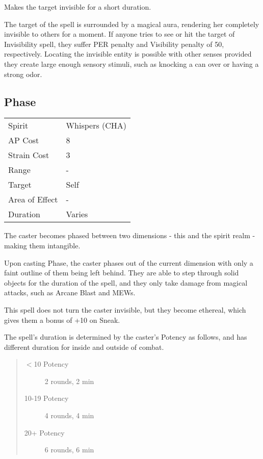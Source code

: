 \documentclass[11pt,a4paper,twocolumn]{book}
\begin{document}
\medskip

Makes the target invisible for a short duration.

The target of the spell is surrounded by a magical aura, rendering her completely invisible to others for a moment. If anyone tries to see or hit the target of Invisibility spell, they suffer PER penalty and Visibility penalty of 50, respectively. Locating the invisible entity is possible with other senses provided they create large enough sensory stimuli, such as knocking a can over or having a strong odor.

\vfill

\subsection*{Phase}
{
	\begin{tabu} to 75mm{| X[l,4] | X[l,7] |}
		\hline
		Spirit         & Whispers (CHA) \\
		AP Cost        & 8                   \\
		Strain Cost    & 3                   \\
		Range          & -         \\
		Target         & Self            \\
		Area of Effect & -                   \\
		Duration       & Varies              \\ \hline
	\end{tabu}
	
}

\medskip

The caster becomes phased between two dimensions - this and the spirit realm - making them intangible.

Upon casting Phase, the caster phases out of the current dimension with only a faint outline of them being left behind. They are able to step through solid objects for the duration of the spell, and they only take damage from magical attacks, such as Arcane Blast and MEWs.

This spell does not turn the caster invisible, but they become ethereal, which gives them a bonus of +10 on Sneak.

The spell's duration is determined by the caster's Potency as follows, and has different duration for inside and outside of combat.

\begin{quote}
	\begin{description}
		\item[$<$10 Potency] 	2 rounds, 2 min
		\item[10-19 Potency] 	4 rounds, 4 min
		\item[20+ Potency] 		6 rounds, 6 min
	\end{description}	
\end{quote}
\end{document}
